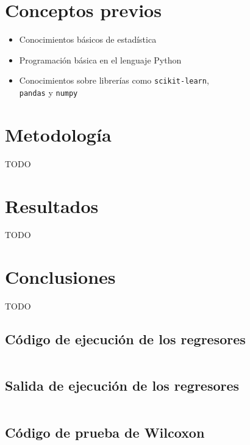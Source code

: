 \documentclass[sigconf,authorversion,nonacm]{acmart}
\begin{document}
\section{Conceptos previos}
\begin{itemize}
  \item Conocimientos básicos de estadística
  \item Programación básica en el lenguaje Python
  \item Conocimientos sobre librerías como \texttt{scikit-learn},\\\texttt{pandas} y \texttt{numpy}
\end{itemize}


\section{Metodología}
TODO


\section{Resultados}
TODO


\section{Conclusiones}
TODO





\clearpage

\appendix

\begin{figure*}
  \section{Código de ejecución de los regresores}
  \label{appendix:regs}
  \inputminted[lastline=60]{python}{/home/mario/git/MarioJim/AirbnbPricePrediction/generate_mses.py}
\end{figure*}

\begin{figure*}
  \section{Salida de ejecución de los regresores}
  \label{appendix:regs_out}
  \inputminted{text}{/home/mario/git/MarioJim/AirbnbPricePrediction/output_generate_mses.txt}
\end{figure*}

\begin{figure*}
  \section{Código de prueba de Wilcoxon}
  \label{appendix:wilc}
  \inputminted{python}{/home/mario/git/MarioJim/AirbnbPricePrediction/wilcoxon_test.py}
\end{figure*}
\end{document}
